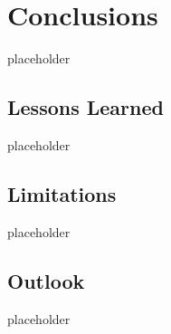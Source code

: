 

\chapter{Conclusions}
\label{chap:conclusion}
placeholder

\section{Lessons Learned}
placeholder
\section{Limitations}
placeholder

\section{Outlook}
placeholder